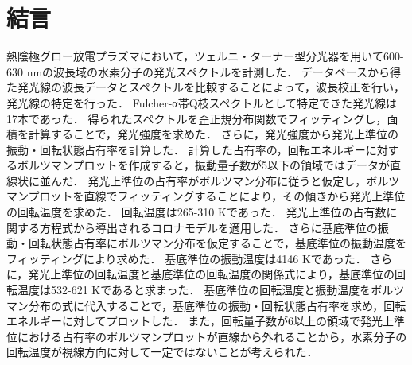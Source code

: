 \chapter{結言}

熱陰極グロー放電プラズマにおいて，ツェルニ・ターナー型分光器を用いて600-630 nmの波長域の水素分子の発光スペクトルを計測した．
データベースから得た発光線の波長データとスペクトルを比較することによって，波長校正を行い，発光線の特定を行った．
Fulcher-α帯Q枝スペクトルとして特定できた発光線は17本であった．
得られたスペクトルを歪正規分布関数でフィッティングし，面積を計算することで，発光強度を求めた．
さらに，発光強度から発光上準位の振動・回転状態占有率を計算した．
計算した占有率の，回転エネルギーに対するボルツマンプロットを作成すると，振動量子数が5以下の領域ではデータが直線状に並んだ．
発光上準位の占有率がボルツマン分布に従うと仮定し，ボルツマンプロットを直線でフィッティングすることにより，その傾きから発光上準位の回転温度を求めた．
回転温度は265-310 Kであった．
発光上準位の占有数に関する方程式から導出されるコロナモデルを適用した．
さらに基底準位の振動・回転状態占有率にボルツマン分布を仮定することで，基底準位の振動温度をフィッティングにより求めた．
基底準位の振動温度は4146 Kであった．
さらに，発光上準位の回転温度と基底準位の回転温度の関係式により，基底準位の回転温度は532-621 Kであると求まった．
基底準位の回転温度と振動温度をボルツマン分布の式に代入することで，基底準位の振動・回転状態占有率を求め，回転エネルギーに対してプロットした．
また，回転量子数が6以上の領域で発光上準位における占有率のボルツマンプロットが直線から外れることから，水素分子の回転温度が視線方向に対して一定ではないことが考えられた．